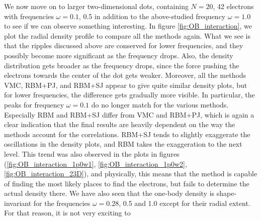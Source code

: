 We now move on to larger two-dimensional dots, containing $N=20$, 42 electrons with frequencies $\omega=0.1$, 0.5 in addition to the above-studied frequency $\omega=1.0$ to see if we can observe something interesting. In figure \eqref{fig:OB_interaction}, we plot the radial density profile to compare all the methods again. What we see is that the ripples discussed above are conserved for lower frequencies, and they possibly become more significant as the frequency drops. Also, the density distribution gets broader as the frequency drops, since the force pushing the electrons towards the center of the dot gets weaker. Moreover, all the methods VMC, RBM+PJ, and RBM+SJ appear to give quite similar density plots, but for lower frequencies, the difference gets gradually more visible. In particular, the peaks for frequency $\omega=0.1$ do no longer match for the various methods. Especially RBM and RBM+SJ differ from VMC and RBM+PJ, which is again a clear indication that the final results are heavily dependent on the way the methods account for the correlations. RBM+SJ tends to slightly exaggerate the oscillations in the density plots, and RBM takes the exaggeration to the next level. This trend was also observed in the plots in figures (\ref{fig:OB_interaction_1p0w1}, \ref{fig:OB_interaction_1p0w2}, \ref{fig:OB_interaction_23D}), and physically, this means that the method is capable of finding the most likely places to find the electrons, but fails to determine the actual density there. We have also seen that the one-body density is shape-invariant for the frequencies $\omega=0.28$, 0.5 and 1.0 except for their radial extent. For that reason, it is not very exciting to 

